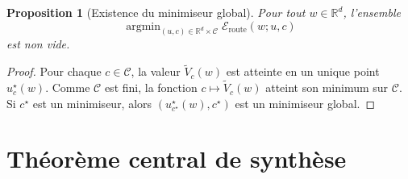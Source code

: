 \documentclass[11pt,a4paper]{article}
\newtheorem{proposition}{Proposition}[section]
\DeclareMathOperator{\argmin}{argmin}
\newcommand{\R}{\mathbb R}
\newcommand{\Ccal}{\mathcal C}
\begin{document}
\begin{proposition}[Existence du minimiseur global]
Pour tout \(w\in\R^d\), l'ensemble
\[
\argmin_{(u,c)\in \R^d\times\Ccal}\mathcal E_{\mathrm{route}}(w;u,c)
\]
est non vide.
\end{proposition}

\begin{proof}
Pour chaque \(c\in\Ccal\), la valeur \(\widetilde V_c(w)\) est atteinte en un unique point \(u_c^\star(w)\). Comme \(\Ccal\) est fini, la fonction \(c\mapsto \widetilde V_c(w)\) atteint son minimum sur \(\Ccal\). Si \(c^\star\) est un minimiseur, alors \((u_{c^\star}^\star(w),c^\star)\) est un minimiseur global.
\end{proof}

\section{Théorème central de synthèse}
\end{document}
